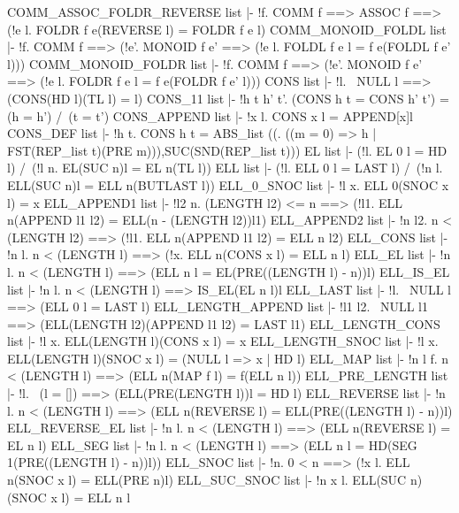 \ENDTHEOREM
\THEOREM COMM\_ASSOC\_FOLDR\_REVERSE list
|- !f. COMM f ==> ASSOC f ==> (!e l. FOLDR f e(REVERSE l) = FOLDR f e l)
\ENDTHEOREM
\THEOREM COMM\_MONOID\_FOLDL list
|- !f.
    COMM f ==>
    (!e'. MONOID f e' ==> (!e l. FOLDL f e l = f e(FOLDL f e' l)))
\ENDTHEOREM
\THEOREM COMM\_MONOID\_FOLDR list
|- !f.
    COMM f ==>
    (!e'. MONOID f e' ==> (!e l. FOLDR f e l = f e(FOLDR f e' l)))
\ENDTHEOREM
\THEOREM CONS list
|- !l. ~NULL l ==> (CONS(HD l)(TL l) = l)
\ENDTHEOREM
\THEOREM CONS\_11 list
|- !h t h' t'. (CONS h t = CONS h' t') = (h = h') /\ (t = t')
\ENDTHEOREM
\THEOREM CONS\_APPEND list
|- !x l. CONS x l = APPEND[x]l
\ENDTHEOREM
\THEOREM CONS\_DEF list
|- !h t.
    CONS h t =
    ABS_list
    ((\m. ((m = 0) => h | FST(REP_list t)(PRE m))),SUC(SND(REP_list t)))
\ENDTHEOREM
\THEOREM EL list
|- (!l. EL 0 l = HD l) /\ (!l n. EL(SUC n)l = EL n(TL l))
\ENDTHEOREM
\THEOREM ELL list
|- (!l. ELL 0 l = LAST l) /\ (!n l. ELL(SUC n)l = ELL n(BUTLAST l))
\ENDTHEOREM
\THEOREM ELL\_0\_SNOC list
|- !l x. ELL 0(SNOC x l) = x
\ENDTHEOREM
\THEOREM ELL\_APPEND1 list
|- !l2 n.
    (LENGTH l2) <= n ==>
    (!l1. ELL n(APPEND l1 l2) = ELL(n - (LENGTH l2))l1)
\ENDTHEOREM
\THEOREM ELL\_APPEND2 list
|- !n l2. n < (LENGTH l2) ==> (!l1. ELL n(APPEND l1 l2) = ELL n l2)
\ENDTHEOREM
\THEOREM ELL\_CONS list
|- !n l. n < (LENGTH l) ==> (!x. ELL n(CONS x l) = ELL n l)
\ENDTHEOREM
\THEOREM ELL\_EL list
|- !n l. n < (LENGTH l) ==> (ELL n l = EL(PRE((LENGTH l) - n))l)
\ENDTHEOREM
\THEOREM ELL\_IS\_EL list
|- !n l. n < (LENGTH l) ==> IS_EL(EL n l)l
\ENDTHEOREM
\THEOREM ELL\_LAST list
|- !l. ~NULL l ==> (ELL 0 l = LAST l)
\ENDTHEOREM
\THEOREM ELL\_LENGTH\_APPEND list
|- !l1 l2. ~NULL l1 ==> (ELL(LENGTH l2)(APPEND l1 l2) = LAST l1)
\ENDTHEOREM
\THEOREM ELL\_LENGTH\_CONS list
|- !l x. ELL(LENGTH l)(CONS x l) = x
\ENDTHEOREM
\THEOREM ELL\_LENGTH\_SNOC list
|- !l x. ELL(LENGTH l)(SNOC x l) = (NULL l => x | HD l)
\ENDTHEOREM
\THEOREM ELL\_MAP list
|- !n l f. n < (LENGTH l) ==> (ELL n(MAP f l) = f(ELL n l))
\ENDTHEOREM
\THEOREM ELL\_PRE\_LENGTH list
|- !l. ~(l = []) ==> (ELL(PRE(LENGTH l))l = HD l)
\ENDTHEOREM
\THEOREM ELL\_REVERSE list
|- !n l.
    n < (LENGTH l) ==> (ELL n(REVERSE l) = ELL(PRE((LENGTH l) - n))l)
\ENDTHEOREM
\THEOREM ELL\_REVERSE\_EL list
|- !n l. n < (LENGTH l) ==> (ELL n(REVERSE l) = EL n l)
\ENDTHEOREM
\THEOREM ELL\_SEG list
|- !n l. n < (LENGTH l) ==> (ELL n l = HD(SEG 1(PRE((LENGTH l) - n))l))
\ENDTHEOREM
\THEOREM ELL\_SNOC list
|- !n. 0 < n ==> (!x l. ELL n(SNOC x l) = ELL(PRE n)l)
\ENDTHEOREM
\THEOREM ELL\_SUC\_SNOC list
|- !n x l. ELL(SUC n)(SNOC x l) = ELL n l
